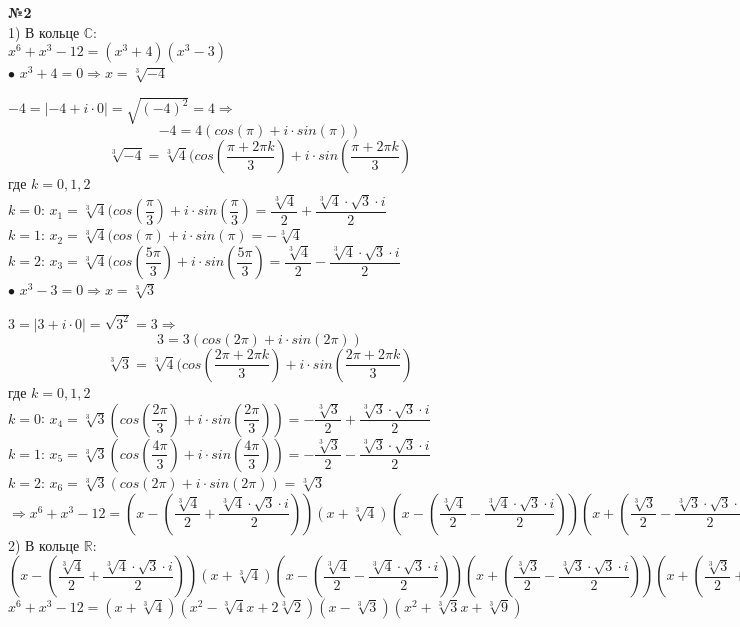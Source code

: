\documentclass[a4paper, 12pt]{article}
\newcommand{\R}{\mathbb{R}}
\newcommand\tab[1][1cm]{\hspace*{#1}}
\begin{document}
	\textbf{№2} \\
	
	1) В кольце $\mathbb{C}$: \\
	$x^6+x^3-12 = (x^3+4)(x^3-3)$ \\
	
	$\bullet$ $x^3+4 = 0 \Rightarrow x = \sqrt[3]{-4}$
	
	$-4 = |-4 + i\cdot0| = \sqrt{(-4)^2} = 4 \Rightarrow$
	$$-4 = 4(cos(\pi) +i\cdot sin(\pi))$$
	$$\sqrt[3]{-4} = \sqrt[3]{4}(cos(\dfrac{\pi+2\pi k}{3}) + i\cdot sin(\dfrac{\pi+2\pi k}{3})$$
	где $k = 0, 1, 2$ \\
	\tab $k = 0$: $x_1 = \sqrt[3]{4}(cos(\dfrac{\pi}{3}) + i\cdot sin(\dfrac{\pi}{3}) = \dfrac{\sqrt[3]{4}}{2} + \dfrac{\sqrt[3]{4}\cdot\sqrt{3}\cdot i}{2}$ \\
	\tab $k = 1$: $x_2 = \sqrt[3]{4}(cos(\pi) + i\cdot sin(\pi) = -\sqrt[3]{4}$ \\
	\tab $k = 2$: $x_3 = \sqrt[3]{4}(cos(\dfrac{5\pi}{3}) + i\cdot sin(\dfrac{5\pi}{3}) = \dfrac{\sqrt[3]{4}}{2} - \dfrac{\sqrt[3]{4}\cdot\sqrt{3}\cdot i}{2}$ \\
	
	$\bullet$ $x^3-3 = 0 \Rightarrow x = \sqrt[3]{3}$
	
	$3 = |3 + i\cdot0| = \sqrt{3^2} = 3 \Rightarrow$
	$$3 = 3(cos(2\pi) +i\cdot sin(2\pi))$$
	$$\sqrt[3]{3} = \sqrt[3]{4}(cos(\dfrac{2\pi+2\pi k}{3}) + i\cdot sin(\dfrac{2\pi+2\pi k}{3})$$
	где $k = 0, 1, 2$ \\
	\tab $k = 0$: $x_4 = \sqrt[3]{3}(cos(\dfrac{2\pi}{3}) + i\cdot sin(\dfrac{2\pi}{3})) = -\dfrac{\sqrt[3]{3}}{2} + \dfrac{\sqrt[3]{3}\cdot\sqrt{3}\cdot i}{2}$ \\
	\tab $k = 1$: $x_5 = \sqrt[3]{3}(cos(\dfrac{4\pi}{3}) + i\cdot sin(\dfrac{4\pi}{3})) = -\dfrac{\sqrt[3]{3}}{2} - \dfrac{\sqrt[3]{3}\cdot\sqrt{3}\cdot i}{2}$ \\
	\tab $k = 2$: $x_6 = \sqrt[3]{3}(cos(2\pi) + i\cdot sin(2\pi)) = \sqrt[3]{3}$ \\
	
	$\Rightarrow x^6+x^3-12 = (x - (\dfrac{\sqrt[3]{4}}{2} + \dfrac{\sqrt[3]{4}\cdot\sqrt{3}\cdot i}{2}))(x + \sqrt[3]{4})(x - (\dfrac{\sqrt[3]{4}}{2} - \dfrac{\sqrt[3]{4}\cdot\sqrt{3}\cdot i}{2}))(x + (\dfrac{\sqrt[3]{3}}{2} - \dfrac{\sqrt[3]{3}\cdot\sqrt{3}\cdot i}{2}))(x + (\dfrac{\sqrt[3]{3}}{2} + \dfrac{\sqrt[3]{3}\cdot\sqrt{3}\cdot i}{2}))(x - \sqrt[3]{3})$ \\
	
	2) В кольце $\R$: \\
	$(x - (\dfrac{\sqrt[3]{4}}{2} + \dfrac{\sqrt[3]{4}\cdot\sqrt{3}\cdot i}{2}))(x + \sqrt[3]{4})(x - (\dfrac{\sqrt[3]{4}}{2} - \dfrac{\sqrt[3]{4}\cdot\sqrt{3}\cdot i}{2}))(x + (\dfrac{\sqrt[3]{3}}{2} - \dfrac{\sqrt[3]{3}\cdot\sqrt{3}\cdot i}{2}))(x + (\dfrac{\sqrt[3]{3}}{2} + \dfrac{\sqrt[3]{3}\cdot\sqrt{3}\cdot i}{2}))(x - \sqrt[3]{3}) = (x + \sqrt[3]{4})(x^2 - \sqrt[3]{4}x + 2\sqrt[3]{2})(x - \sqrt[3]{3})(x^2 + \sqrt[3]{3}x + \sqrt[3]{9}) \Rightarrow$ \\
	$$x^6+x^3-12 = (x + \sqrt[3]{4})(x^2 - \sqrt[3]{4}x + 2\sqrt[3]{2})(x - \sqrt[3]{3})(x^2 + \sqrt[3]{3}x + \sqrt[3]{9})$$ \\
	
\end{document}
